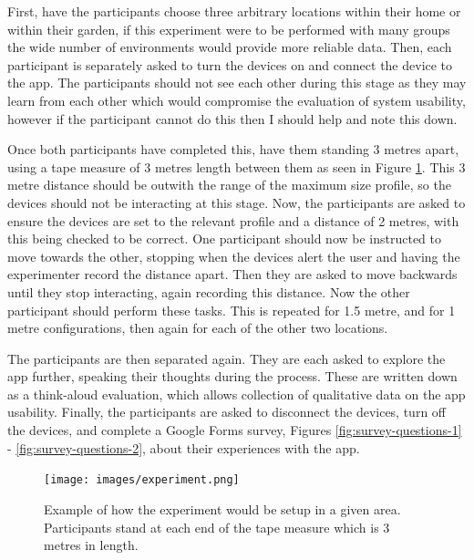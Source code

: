 \documentclass{l4proj}
\begin{document}
First, have the participants choose three arbitrary locations within their home or within their garden, if this experiment were to be performed with many groups the wide number of environments would provide more reliable data. Then, each participant is separately asked to turn the devices on and connect the device to the app. The participants should not see each other during this stage as they may learn from each other which would compromise the evaluation of system usability, however if the participant cannot do this then I should help and note this down.

Once both participants have completed this, have them standing 3 metres apart, using a tape measure of 3 metres length between them as seen in Figure \ref{fig:experiment_setup}. This 3 metre distance should be outwith the range of the maximum size profile, so the devices should not be interacting at this stage. Now, the participants are asked to ensure the devices are set to the relevant profile and a distance of 2 metres, with this being checked to be correct. One participant should now be instructed to move towards the other, stopping when the devices alert the user and having the experimenter record the distance apart. Then they are asked to move backwards until they stop interacting, again recording this distance. Now the other participant should perform these tasks. This is repeated for 1.5 metre, and for 1 metre configurations, then again for each of the other two locations.

The participants are then separated again. They are each asked to explore the app further, speaking their thoughts during the process. These are written down as a think-aloud evaluation, which allows collection of qualitative data on the app usability. Finally, the participants are asked to disconnect the devices, turn off the devices, and complete a Google Forms survey, Figures \ref{fig:survey-questions-1} - \ref{fig:survey-questions-2}, about their experiences with the app.

\begin{figure}[!htb]
    \centering
    \texttt{[image: images/experiment.png]}

    \caption{ Example of how the experiment would be setup in a given area. Participants stand at each end of the tape measure which is 3 metres in length. }

    \label{fig:experiment_setup}
\end{figure}
\end{document}
